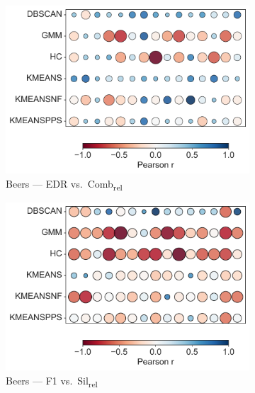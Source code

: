 \documentclass[10pt]{article} %
\numberwithin{equation}{section}
\begin{document}
\begin{enumerate}[label=(\alph*)]
\begin{figure}[H]  %
  \centering
  \begin{subfigure}[b]{0.33\linewidth}
    \includegraphics[width=\linewidth]{figures/6.4.3graph/BE_EDR_vs_Comb_relative.pdf}
    \caption{Beers — EDR vs.\ Comb\textsubscript{rel}}
    \label{fig:be_edr_comb}
  \end{subfigure}\hfill
  \begin{subfigure}[b]{0.33\linewidth}
    \includegraphics[width=\linewidth]{figures/6.4.3graph/BE_F1_vs_Sil_relative.pdf}
    \caption{Beers — F1 vs.\ Sil\textsubscript{rel}}
    \label{fig:be_f1_sil}
  \end{subfigure}\hfill
  \begin{subfigure}[b]{0.33\linewidth}

\end{subfigure}
\end{figure}
\end{enumerate}
\end{document}
